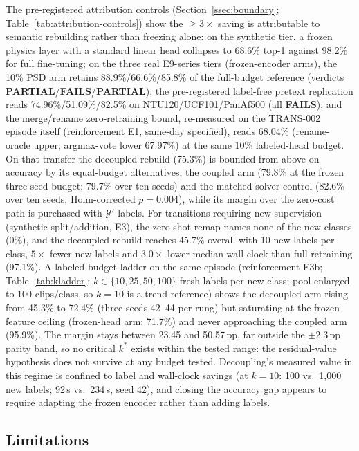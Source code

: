 The pre-registered attribution controls (Section~\ref{ssec:boundary}; Table~\ref{tab:attribution-controls}) show the $\geq 3\times$ saving is attributable to semantic rebuilding rather than freezing alone: on the synthetic tier, a frozen physics layer with a standard linear head collapses to 68.6\% top-1 against 98.2\% for full fine-tuning; on the three real E9-series tiers (frozen-encoder arms), the 10\% PSD arm retains 88.9\%/66.6\%/85.8\% of the full-budget reference (verdicts \textbf{PARTIAL}/\textbf{FAILS}/\textbf{PARTIAL}); the pre-registered label-free pretext replication reads 74.96\%/51.09\%/82.5\% on NTU120/UCF101/PanAf500 (all \textbf{FAILS}); and the merge/rename zero-retraining bound, re-measured on the TRANS-002 episode itself (reinforcement E1, same-day specified), reads 68.04\% (rename-oracle upper; argmax-vote lower 67.97\%) at the same 10\% labeled-head budget. On that transfer the decoupled rebuild (75.3\%) is bounded from above on accuracy by its equal-budget alternatives, the coupled arm (79.8\% at the frozen three-seed budget; 79.7\% over ten seeds) and the matched-solver control (82.6\% over ten seeds, Holm-corrected $p=0.004$), while its margin over the zero-cost path is purchased with $\mathcal{Y}'$ labels. For transitions requiring new supervision (synthetic split/addition, E3), the zero-shot remap names none of the new classes (0\%), and the decoupled rebuild reaches 45.7\% overall with 10 new labels per class, $5\times$ fewer new labels and $3.0\times$ lower median wall-clock than full retraining (97.1\%). A labeled-budget ladder on the same episode (reinforcement E3b; Table~\ref{tab:kladder}; $k\in\{10,25,50,100\}$ fresh labels per new class; pool enlarged to 100 clips/class, so $k{=}10$ is a trend reference) shows the decoupled arm rising from 45.3\% to 72.4\% (three seeds 42--44 per rung) but saturating at the frozen-feature ceiling (frozen-head arm: 71.7\%) and never approaching the coupled arm (95.9\%). The margin stays between 23.45 and 50.57\,pp, far outside the $\pm2.3$\,pp parity band, so no critical $k^{\ast}$ exists within the tested range: the residual-value hypothesis does not survive at any budget tested. Decoupling's measured value in this regime is confined to label and wall-clock savings (at $k{=}10$: 100 vs.\ 1{,}000 new labels; 92\,s vs.\ 234\,s, seed 42), and closing the accuracy gap appears to require adapting the frozen encoder rather than adding labels.

\subsection{Limitations}

